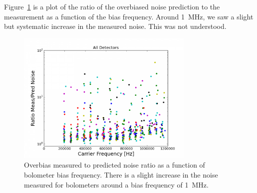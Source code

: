 
Figure~\ref{fig:overbias_noise_vs_freq} is a plot of the ratio of the overbiased noise prediction to the measurement as a function of the bias frequency. 
Around 1~MHz, we saw a slight but systematic increase in the measured noise. 
This was not understood. 

\begin{figure}[htp]
\begin{center}
\includegraphics[height=2.5in]{figures/overbias_noise_vs_freq}
\caption[Measured/predicted overbias noise as a function of bias frequency]{Overbias measured to predicted noise ratio as a function of bolometer bias frequency. There is a slight increase in the noise measured for bolometers around a bias frequency of 1~MHz. 
\label{fig:overbias_noise_vs_freq} }
\end{center}
\end{figure}

%







